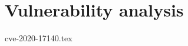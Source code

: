 \documentclass{report}
\begin{document}
\chapter{Vulnerability analysis}
\label{cha:vulnerability-analysis}

{cve-2020-17140.tex}
\end{document}
